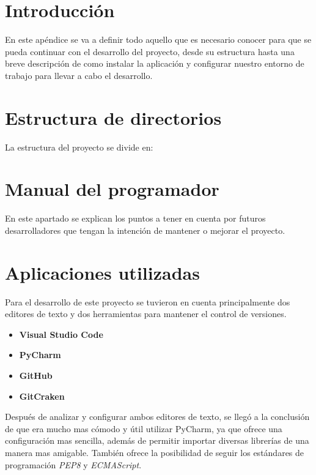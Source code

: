 

\section{Introducción}
En este apéndice se va a definir todo aquello que es necesario conocer para que se pueda continuar con el desarrollo del proyecto, desde su estructura hasta una breve descripción de como instalar la aplicación y configurar nuestro entorno de trabajo para llevar a cabo el desarrollo.

\section{Estructura de directorios}
La estructura del proyecto se divide en:

\section{Manual del programador}
En este apartado se explican los puntos a tener en cuenta por futuros desarrolladores que tengan la intención de mantener o mejorar el proyecto.

\section{Aplicaciones utilizadas}
Para el desarrollo de este proyecto se tuvieron en cuenta principalmente dos editores de texto y dos herramientas para mantener el control de versiones.

\begin{itemize}
	\item \textbf{Visual Studio Code} 
	\item \textbf{PyCharm}
	\item \textbf{GitHub}
	\item \textbf{GitCraken}
\end{itemize}
Después de analizar y configurar ambos editores de texto, se llegó a la conclusión de que era mucho mas cómodo y útil utilizar PyCharm, ya que ofrece una configuración mas sencilla, además de permitir importar diversas librerías de una manera mas amigable. También ofrece la posibilidad de seguir los estándares de programación \textit{PEP8} y \textit{ECMAScript}.

